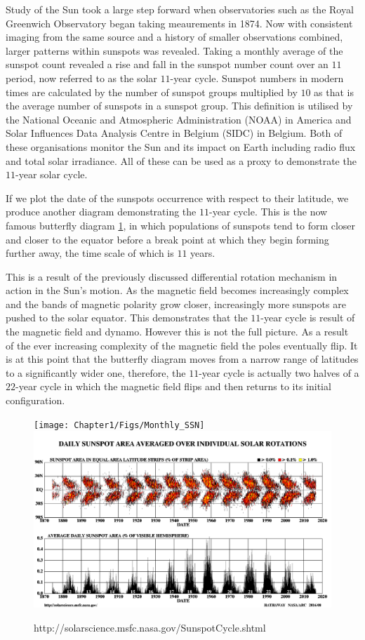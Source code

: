 Study of the Sun took a large step forward when observatories such as the Royal Greenwich Observatory began taking meaurements in 1874.
Now with consistent imaging from the same source and a history of smaller observations combined, larger patterns within sunspots was revealed.
Taking a monthly average of the sunspot count revealed a rise and fall in the sunspot number count over an $11$ period, now referred to as the solar $11$-year cycle.
Sunspot numbers in modern times are calculated by the number of sunspot groups multiplied by $10$ as that is the average number of sunspots in a sunspot group.
This definition is utilised by the National Oceanic and Atmospheric Administration (NOAA) in America and Solar Influences Data Analysis Centre in Belgium (SIDC) in Belgium.
Both of these organisations monitor the Sun and its impact on Earth including radio flux and total solar irradiance.
All of these can be used as a proxy to demonstrate the $11$-year solar cycle.

If we plot the date of the sunspots occurrence with respect to their latitude, we produce another diagram demonstrating the $11$-year cycle.
This is the now famous butterfly diagram \ref{fig:sunspot_count}, in which populations of sunspots tend to form closer and closer to the equator before a break point at which they begin forming further away, the time scale of which is $11$ years.

This is a result of the previously discussed differential rotation mechanism in action in the Sun's motion.
As the magnetic field becomes increasingly complex and the bands of magnetic polarity grow closer, increasingly more sunspots are pushed to the solar equator.
This demonstrates that the $11$-year cycle is result of the magnetic field and dynamo.
However this is not the full picture.
As a result of the ever increasing complexity of the magnetic field the poles eventually flip.
It is at this point that the butterfly diagram moves from a narrow range of latitudes to a significantly wider one, therefore, the $11$-year cycle is actually two halves of a $22$-year cycle in which the magnetic field flips and then returns to its initial configuration.

\begin{figure}
	\texttt{[image: Chapter1/Figs/Monthly\_SSN]}
	\includegraphics[scale=0.2]{Chapter1/Figs/bfly}
	\caption{http://solarscience.msfc.nasa.gov/SunspotCycle.shtml}
	\label{fig:sunspot_count}
\end{figure}

